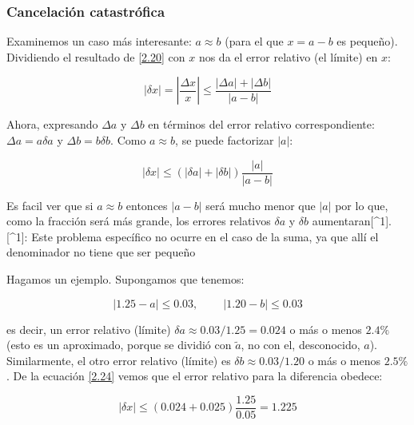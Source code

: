 \documentclass[11pt]{article}
\begin{document}
\hypertarget{cancelaciuxf3n-catastruxf3fica}{%
\subsubsection{Cancelación
catastrófica}\label{cancelaciuxf3n-catastruxf3fica}}

Examinemos un caso más interesante: \(a \approx b\) (para el que
\(x = a - b\) es pequeño). Dividiendo el resultado de \eqref{2.20} con
\(x\) nos da el error relativo (el límite) en \(x\):

\[
\begin{equation}
|\delta x| = \left| \frac{\Delta x}{x} \right| \leq \frac{|\Delta a| + |\Delta b|}{|a - b|} \label{2.23}\tag{20}
\end{equation}
\]

Ahora, expresando \(\Delta a\) y \(\Delta b\) en términos del error
relativo correspondiente: \(\Delta a = a \delta a\) y
\(\Delta b = b \delta b\). Como \(a \approx b\), se puede factorizar
\(|a|\):

\[
\begin{equation}
|\delta x| \leq (|\delta a| + |\delta b|)\frac{|a|}{|a - b|} \label{2.24}\tag{21}
\end{equation}
\]

Es facil ver que si \(a \approx b\) entonces \(|a - b|\) será mucho
menor que \(|a|\) por lo que, como la fracción será más grande, los
errores relativos \(\delta a\) y \(\delta b\) aumentaran{[}\^{}1{]}.
{[}\^{}1{]}: Este problema específico no ocurre en el caso de la suma,
ya que allí el denominador no tiene que ser pequeño

Hagamos un ejemplo. Supongamos que tenemos:

\[
\begin{equation}
|1.25 - a| \leq 0.03, \ \ \ \ \ \ \ \ \ \ |1.20 - b| \leq 0.03 \label{2.25}\tag{22}
\end{equation}
\]

es decir, un error relativo (límite)
\(\delta a \approx 0.03/1.25 = 0.024\) o más o menos \(2.4\%\) (esto es
un aproximado, porque se dividió con \(\tilde{a}\), no con el,
desconocido, \(a\)). Similarmente, el otro error relativo (límite) es
\(\delta b \approx 0.03/1.20\) o más o menos \(2.5\%\). De la ecuación
\eqref{2.24} vemos que el error relativo para la diferencia obedece:

\[
\begin{equation}
|\delta x| \leq (0.024 + 0.025) \frac{1.25}{0.05} = 1.225 \label{2.26}\tag{23}
\end{equation}
\]
\end{document}
